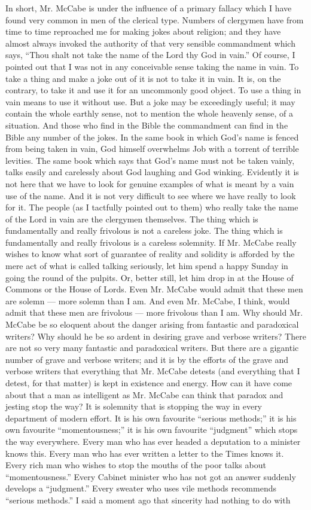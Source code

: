 In short, Mr. McCabe is under the influence of a primary fallacy which I have found very common in men of the clerical type. Numbers of clergymen have from time to time reproached me for making jokes about religion; and they have almost always invoked the authority of that very sensible commandment which says, “Thou shalt not take the name of the Lord thy God in vain.” Of course, I pointed out that I was not in any conceivable sense taking the name in vain. To take a thing and make a joke out of it is not to take it in vain. It is, on the contrary, to take it and use it for an uncommonly good object. To use a thing in vain means to use it without use. But a joke may be exceedingly useful; it may contain the whole earthly sense, not to mention the whole heavenly sense, of a situation. And those who find in the Bible the commandment can find in the Bible any number of the jokes. In the same book in which God’s name is fenced from being taken in vain, God himself overwhelms Job with a torrent of terrible levities. The same book which says that God’s name must not be taken vainly, talks easily and carelessly about God laughing and God winking. Evidently it is not here that we have to look for genuine examples of what is meant by a vain use of the name. And it is not very difficult to see where we have really to look for it. The people (as I tactfully pointed out to them) who really take the name of the Lord in vain are the clergymen themselves. The thing which is fundamentally and really frivolous is not a careless joke. The thing which is fundamentally and really frivolous is a careless solemnity. If Mr. McCabe really wishes to know what sort of guarantee of reality and solidity is afforded by the mere act of what is called talking seriously, let him spend a happy Sunday in going the round of the pulpits. Or, better still, let him drop in at the House of Commons or the House of Lords. Even Mr. McCabe would admit that these men are solemn — more solemn than I am. And even Mr. McCabe, I think, would admit that these men are frivolous — more frivolous than I am. Why should Mr. McCabe be so eloquent about the danger arising from fantastic and paradoxical writers? Why should he be so ardent in desiring grave and verbose writers? There are not so very many fantastic and paradoxical writers. But there are a gigantic number of grave and verbose writers; and it is by the efforts of the grave and verbose writers that everything that Mr. McCabe detests (and everything that I detest, for that matter) is kept in existence and energy. How can it have come about that a man as intelligent as Mr. McCabe can think that paradox and jesting stop the way? It is solemnity that is stopping the way in every department of modern effort. It is his own favourite “serious methods;” it is his own favourite “momentousness;” it is his own favourite “judgment” which stops the way everywhere. Every man who has ever headed a deputation to a minister knows this. Every man who has ever written a letter to the Times knows it. Every rich man who wishes to stop the mouths of the poor talks about “momentousness.” Every Cabinet minister who has not got an answer suddenly develops a “judgment.” Every sweater who uses vile methods recommends “serious methods.” I said a moment ago that sincerity had nothing to do with 